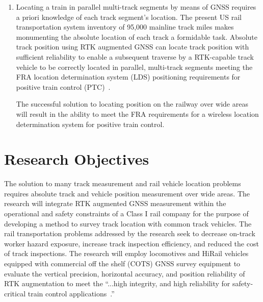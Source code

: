 \begin{enumerate}[1)]
	\item Locating a train in parallel multi-track segments by means of GNSS requires a priori knowledge of each track segment's location. The present US rail transportation system inventory of 95,000 mainline track miles makes monumenting the absolute location of each track a formidable task. Absolute track position using RTK augmented GNSS can locate track position with sufficient reliability to enable a subsequent traverse by a RTK-capable track vehicle to be correctly located in parallel, multi-track segments meeting the FRA location determination system (LDS) positioning requirements for positive train control (PTC)~\citep[pp.3]{1995FRADiffe}.
	
	The successful solution to locating position on the railway over wide areas will result in the ability to meet the FRA requirements for a wireless location determination system for positive train control.
\end{enumerate}  


\section{Research Objectives}
The solution to many track measurement and rail vehicle location problems requires absolute track and vehicle position measurement over wide areas. The research will integrate RTK augmented GNSS measurement within the operational and safety constraints of a Class I rail company for the purpose of developing a method to survey track location with common track vehicles. The rail transportation problems addressed by the research seek to decrease on-track worker hazard exposure, increase track inspection efficiency, and reduced the cost of track inspections. The research will employ locomotives and HiRail vehicles equipped with commercial off the shelf (COTS) GNSS survey equipment to evaluate the vertical precision, horizontal accuracy, and position reliability of RTK augmentation to meet the ``...high integrity, and high reliability for safety-critical train control applications~\citep[pp.11]{2008USDoT_NDGPS}.''

